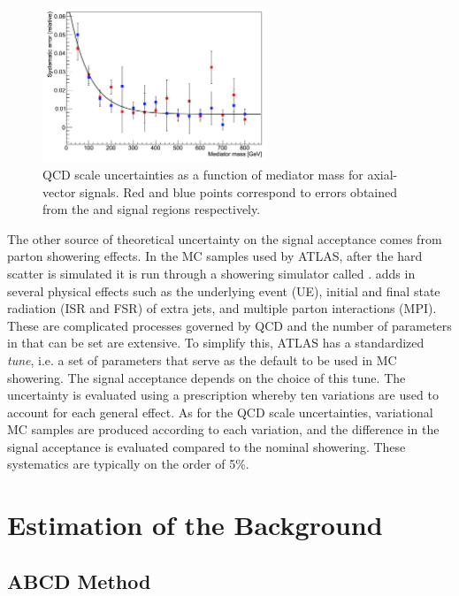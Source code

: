 \begin{figure}[htb]
\centering
\includegraphics[width=0.6\textwidth]{Figures/qcd.png}
\caption{QCD scale uncertainties as a function of mediator mass for axial-vector signals. Red and blue points correspond to errors obtained from the \ee and \mm signal regions respectively.}
\label{fig:qcd}
\end{figure}

The other source of theoretical uncertainty on the signal acceptance comes from parton showering effects. In the MC samples used by ATLAS, after the hard scatter is simulated it is run through a showering simulator called \pythia \cite{Sjostrand:2014zea}. \pythia adds in several physical effects such as the underlying event (UE), initial and final state radiation (ISR and FSR) of extra jets, and multiple parton interactions (MPI). These are complicated processes governed by QCD and the number of parameters in \pythia that can be set are extensive. To simplify this, ATLAS has a standardized \pythia \textit{tune}, i.e. a set of parameters that serve as the default to be used in MC showering. The signal acceptance depends on the choice of this tune. The uncertainty is evaluated using a prescription whereby ten variations are used to account for each general effect. As for the QCD scale uncertainties, variational MC samples are produced according to each variation, and the difference in the signal acceptance is evaluated compared to the nominal showering. These systematics are typically on the order of 5\%.


\section{Estimation of the \Zjets Background}
\label{sec:zjets}

\subsection{ABCD Method}

